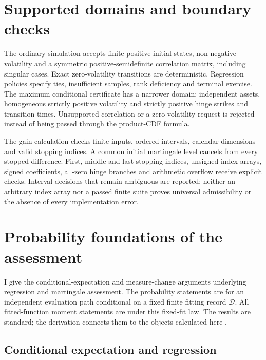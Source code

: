 \documentclass[11pt]{article}
\begin{document}
\section{Supported domains and boundary checks}

The ordinary simulation accepts finite positive initial states, non-negative volatility and a symmetric positive-semidefinite correlation matrix, including singular cases. Exact zero-volatility transitions are deterministic. Regression policies specify ties, insufficient samples, rank deficiency and terminal exercise. The maximum conditional certificate has a narrower domain: independent assets, homogeneous strictly positive volatility and strictly positive hinge strikes and transition times. Unsupported correlation or a zero-volatility request is rejected instead of being passed through the product-CDF formula.

The gain calculation checks finite inputs, ordered intervals, calendar dimensions and valid stopping indices. A common initial martingale level cancels from every stopped difference. First, middle and last stopping indices, unsigned index arrays, signed coefficients, all-zero hinge branches and arithmetic overflow receive explicit checks. Interval decisions that remain ambiguous are reported; neither an arbitrary index array nor a passed finite suite proves universal admissibility or the absence of every implementation error.

\section{Probability foundations of the assessment}
\label{app:probability-foundations}

I give the conditional-expectation and measure-change arguments underlying regression and martingale assessment. The probability statements are for an independent evaluation path conditional on a fixed finite fitting record $\mathcal D$. All fitted-function moment statements are under this fixed-fit law. The results are standard; the derivation connects them to the objects calculated here \citep{williams1991,shreve2004}.

\subsection{Conditional expectation and regression}
\end{document}
